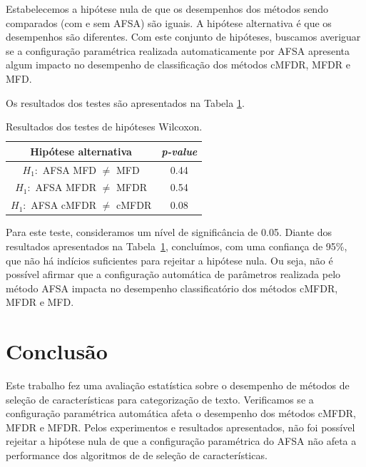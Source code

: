 \documentclass[conference]{IEEEtran}
\begin{document}
Estabelecemos a hipótese nula de que os desempenhos dos métodos sendo comparados (com e sem AFSA) são iguais. A hipótese alternativa é que os desempenhos são diferentes. Com este conjunto de hipóteses, buscamos averiguar se a configuração paramétrica realizada automaticamente por AFSA apresenta algum impacto no desempenho de classificação dos métodos cMFDR, MFDR e MFD.

Os resultados dos testes são apresentados na Tabela 
\ref{tab:rank_sum}.

\begin{table}[h]
	\centering
	\caption{Resultados dos testes de hipóteses Wilcoxon.}
	\label{tab:rank_sum}
	\begin{tabular}{c|c}
		\hline
		Hipótese alternativa					& \textit{p-value}\\
		\hline
		$H_1:$ AFSA MFD $\neq$ MFD & 0.44 \\
		$H_1:$ AFSA MFDR $\neq$ MFDR & 0.54 \\
		$H_1:$ AFSA cMFDR $\neq$ cMFDR & 0.08 \\
		\hline
	\end{tabular}
\end{table}

Para este teste, consideramos um nível de significância de 0.05.
Diante dos resultados apresentados na Tabela~\ref{tab:rank_sum}, concluímos, com uma confiança de 95\%, que não há indícios suficientes para rejeitar a hipótese nula. Ou seja, não é possível afirmar que a configuração automática de parâmetros realizada pelo método AFSA impacta no desempenho classificatório dos métodos cMFDR, MFDR e MFD.


\section{Conclusão}
\label{sec:conclusao}

Este trabalho fez uma avaliação estatística sobre o desempenho de métodos de seleção de características para categorização de texto. Verificamos se a configuração paramétrica automática afeta o desempenho dos métodos cMFDR, MFDR e MFDR.
Pelos experimentos e resultados apresentados, não foi possível rejeitar a hipótese nula de que a configuração paramétrica do AFSA não afeta a performance dos algoritmos de de seleção de características.
\end{document}

